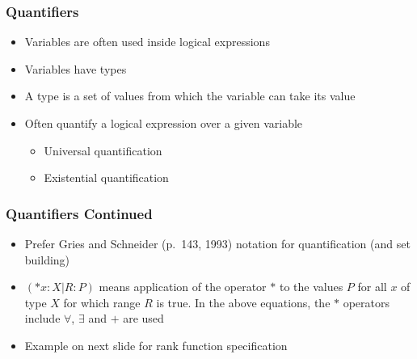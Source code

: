 \documentclass[t,12pt,numbers,fleqn]{beamer}
\begin{document}

\begin{frame}
\frametitle{Quantifiers}
\begin{itemize}
\item Variables are often used inside logical expressions
\item Variables have types
\item A type is a set of values from which the variable can take its value
\item Often quantify a logical expression over a given variable
\begin{itemize}
\item Universal quantification
\item Existential quantification
\end{itemize}
\end{itemize}
\end{frame}


\begin{frame}
\frametitle{Quantifiers Continued}

\begin{itemize}
\item Prefer Gries and Schneider (p.\ 143, 1993) notation for quantification
  (and set building)
\item $(*x: X | R : P)$ means application of the operator $*$ to the values $P$ for
all $x$ of type $X$ for which range $R$ is true.  In the above equations, the
$*$ operators include $\forall$, $\exists$ and $+$ are used
\item Example on next slide for rank function specification
\end{itemize}

\end{frame}

\end{document}
